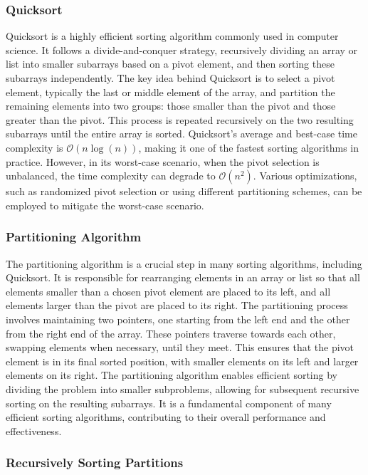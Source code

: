\subsubsection{Quicksort}

Quicksort is a highly efficient sorting algorithm commonly used in computer science. It follows a divide-and-conquer strategy, recursively dividing an array or list into smaller subarrays based on a pivot element, and then sorting these subarrays independently. The key idea behind Quicksort is to select a pivot element, typically the last or middle element of the array, and partition the remaining elements into two groups: those smaller than the pivot and those greater than 
the pivot. This process is repeated recursively on the two resulting subarrays until the entire array is sorted. Quicksort's average and best-case time complexity is $\mathcal{O}(n\log{(n)})$, making it one of the fastest sorting algorithms in practice. However, in its worst-case scenario, when the pivot selection is unbalanced, the time complexity can degrade to $\mathcal{O}(n^2)$. Various optimizations, such as randomized pivot selection or using different partitioning schemes, 
can be employed to mitigate the worst-case scenario.

\subsubsection{Partitioning Algorithm}

The partitioning algorithm is a crucial step in many sorting algorithms, including Quicksort. It is responsible for rearranging elements in an array or list so that all elements smaller than a chosen pivot element are placed to its left, and all elements larger than the pivot are placed to its right. The partitioning process involves maintaining two pointers, one starting from the left end and the other from the right end of the array. These pointers traverse towards each other, 
swapping elements when necessary, until they meet. This ensures that the pivot element is in its final sorted position, with smaller elements on its left and larger elements on its right. The partitioning algorithm enables efficient sorting by dividing the problem into smaller subproblems, allowing for subsequent recursive sorting on the resulting subarrays. It is a fundamental component of many efficient sorting algorithms, contributing to their overall performance and effectiveness.

\subsubsection{Recursively Sorting Partitions}

